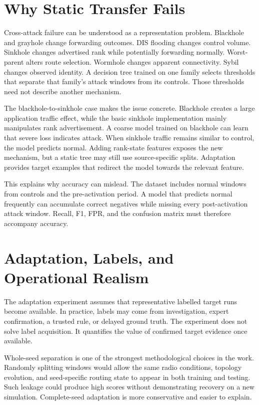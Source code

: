 \section{Why Static Transfer Fails}

Cross-attack failure can be understood as a representation problem. Blackhole and grayhole change forwarding outcomes. DIS flooding changes control volume. Sinkhole changes advertised rank while potentially forwarding normally. Worst-parent alters route selection. Wormhole changes apparent connectivity. Sybil changes observed identity. A decision tree trained on one family selects thresholds that separate that family's attack windows from its controls. Those thresholds need not describe another mechanism.

The blackhole-to-sinkhole case makes the issue concrete. Blackhole creates a large application traffic effect, while the basic sinkhole implementation mainly manipulates rank advertisement. A coarse model trained on blackhole can learn that severe loss indicates attack. When sinkhole traffic remains similar to control, the model predicts normal. Adding rank-state features exposes the new mechanism, but a static tree may still use source-specific splits. Adaptation provides target examples that redirect the model towards the relevant feature.

This explains why accuracy can mislead. The dataset includes normal windows from controls and the pre-activation period. A model that predicts normal frequently can accumulate correct negatives while missing every post-activation attack window. Recall, F1, FPR, and the confusion matrix must therefore accompany accuracy.

\section{Adaptation, Labels, and Operational Realism}

The adaptation experiment assumes that representative labelled target runs become available. In practice, labels may come from investigation, expert confirmation, a trusted rule, or delayed ground truth. The experiment does not solve label acquisition. It quantifies the value of confirmed target evidence once available.

Whole-seed separation is one of the strongest methodological choices in the work. Randomly splitting windows would allow the same radio conditions, topology evolution, and seed-specific routing state to appear in both training and testing. Such leakage could produce high scores without demonstrating recovery on a new simulation. Complete-seed adaptation is more conservative and easier to explain.

